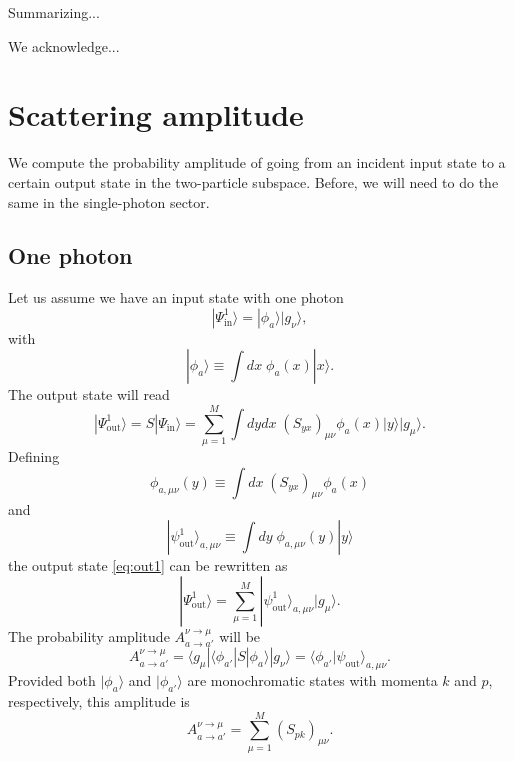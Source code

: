 \documentclass[notitlepage, prx, preprint, amsmath,superscriptaddress,amssymb]{revtex4-1}
\begin{document}
Summarizing...

We acknowledge...

\appendix

\section{Scattering amplitude}\label{app:A}

We compute the probability amplitude of going from an incident input state to a certain output state in the two-particle subspace. Before, we will need to do the same in the single-photon sector. 

\subsection{One photon}

Let us assume we have an input state with one photon
\begin{equation}
|\Psi_\text{in}^1\rangle=|\phi_a\rangle |g_\nu\rangle,
\end{equation}
with
\begin{equation}
|\phi_a\rangle\equiv \int dx\; \phi_a(x)|x\rangle.
\end{equation}
The output state will read
\begin{equation}\label{eq:out1}
|\Psi_\text{out}^1\rangle = S|\Psi_\text{in}\rangle = \sum_{\mu=1}^M \int dy dx\;(S_{yx})_{\mu\nu}\phi_a(x)|y\rangle|g_\mu\rangle.
\end{equation}
Defining
\begin{equation}\label{eq:phi_munu}
\phi_{a,\mu\nu}(y)\equiv \int dx\; (S_{yx})_{\mu\nu} \phi_a(x)
\end{equation}
and
\begin{equation}\label{eq:out_munu}
|\psi_\text{out}^1\rangle_{a,\mu\nu}\equiv \int dy\;\phi_{a,\mu\nu}(y) |y\rangle
\end{equation}
the output state \eqref{eq:out1} can be rewritten as
\begin{equation}
|\Psi_\text{out}^1\rangle = \sum_{\mu=1}^M |\psi_\text{out}^1\rangle_{a,\mu\nu} |g_\mu\rangle.
\end{equation}
The probability amplitude $A_{a\to a'}^{\nu\to\mu}$ will be
\begin{equation}\label{eq:A1}
A_{a\to a'}^{\nu\to\mu} = \langle g_\mu| \langle \phi_{a'}|S|\phi_a\rangle  |g_\nu\rangle = \langle \phi_{a'}|\psi_\text{out}\rangle_{a,\mu\nu}.
\end{equation}
Provided both $|\phi_a\rangle$ and $|\phi_{a'}\rangle$ are monochromatic states with momenta $k$ and $p$, respectively, this amplitude is
\begin{equation}\label{eq:energy_conservation}
A_{a\to a'}^{\nu\to\mu} = \sum_{\mu=1}^M (S_{pk})_{\mu\nu}.
\end{equation}
\end{document}
